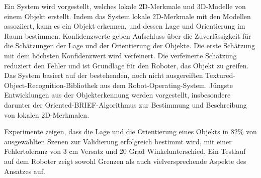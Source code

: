 Ein System wird vorgestellt, welches lokale 2D-Merkmale und 3D-Modelle von
einem Objekt erstellt. Indem das System lokale 2D-Merkmale mit den Modellen
assoziiert, kann es ein Objekt erkennen, und dessen Lage und Orientierung im
Raum bestimmen. Konfidenzwerte geben Aufschluss über die Zuverlässigkeit für
die Schätzungen der Lage und der Orientierung der Objekte.  Die erste Schätzung
mit dem höchsten Konfidenzwert wird verfeinert. Die verfeinerte
Schätzung reduziert den Fehler und ist Grundlage für den Roboter, das Objekt
zu greifen. Das System basiert auf der bestehenden, noch nicht ausgereiften
Textured-Object-Recognition-Bibliothek aus dem Robot-Operating-System.
Jüngste Entwicklungen aus der Objekterkennung werden vorgestellt, insbesondere
darunter der Oriented-BRIEF-Algorithmus zur Bestimmung und Beschreibung von
lokalen 2D-Merkmalen.

Experimente zeigen, dass die Lage und die Orientierung eines Objekts in 82\%
von ausgewählten Szenen zur Validierung erfolgreich bestimmt wird, mit einer
Fehlertoleranz von 3 cm Versatz und 20 Grad Winkelunterschied. Ein Testlauf auf
dem Roboter zeigt sowohl Grenzen als auch vielversprechende Aspekte des
Ansatzes auf.

